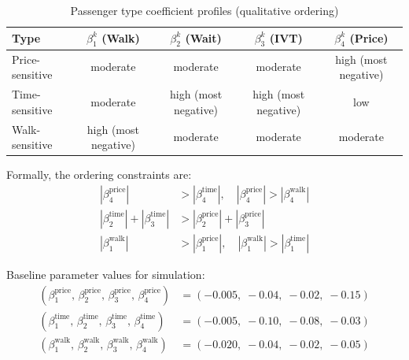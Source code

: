 \begin{table}[h]
\centering
\caption{Passenger type coefficient profiles (qualitative ordering)}
\label{tab:passenger-types}
\begin{tabular}{lcccc}
\toprule
Type & $\beta_1^k$ (Walk) & $\beta_2^k$ (Wait) & $\beta_3^k$ (IVT) & $\beta_4^k$ (Price) \\
\midrule
Price-sensitive  & moderate & moderate & moderate & high (most negative) \\
Time-sensitive   & moderate & high (most negative) & high (most negative) & low \\
Walk-sensitive   & high (most negative) & moderate & moderate & moderate \\
\bottomrule
\end{tabular}
\end{table}

Formally, the ordering constraints are:
\begin{align}
  |\beta_4^{\text{price}}| &> |\beta_4^{\text{time}}|,\quad |\beta_4^{\text{price}}| > |\beta_4^{\text{walk}}| \label{eq:type-price}\\
  |\beta_2^{\text{time}}| + |\beta_3^{\text{time}}| &> |\beta_2^{\text{price}}| + |\beta_3^{\text{price}}| \label{eq:type-time}\\
  |\beta_1^{\text{walk}}| &> |\beta_1^{\text{price}}|,\quad |\beta_1^{\text{walk}}| > |\beta_1^{\text{time}}| \label{eq:type-walk}
\end{align}

Baseline parameter values for simulation:
\begin{align}
  (\beta_1^{\text{price}},\, \beta_2^{\text{price}},\, \beta_3^{\text{price}},\, \beta_4^{\text{price}})
    &= (-0.005,\; -0.04,\; -0.02,\; -0.15) \label{eq:beta-price}\\
  (\beta_1^{\text{time}},\, \beta_2^{\text{time}},\, \beta_3^{\text{time}},\, \beta_4^{\text{time}})
    &= (-0.005,\; -0.10,\; -0.08,\; -0.03) \label{eq:beta-time}\\
  (\beta_1^{\text{walk}},\, \beta_2^{\text{walk}},\, \beta_3^{\text{walk}},\, \beta_4^{\text{walk}})
    &= (-0.020,\; -0.04,\; -0.02,\; -0.05) \label{eq:beta-walk}
\end{align}

